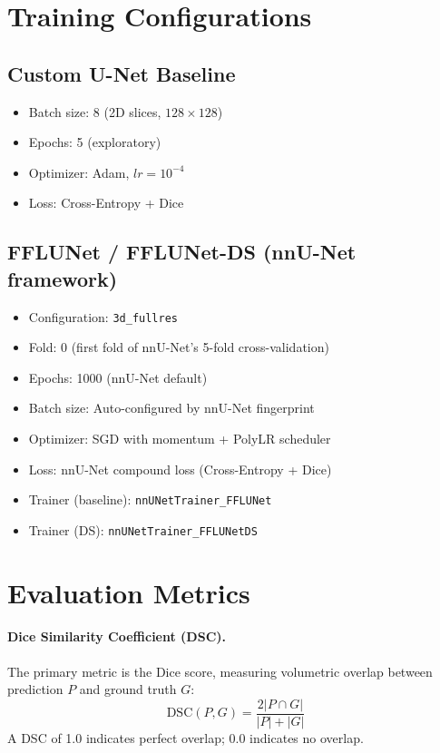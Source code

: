 \documentclass[12pt,a4paper]{report}
\begin{document}
\section{Training Configurations}

\subsection{Custom U-Net Baseline}
\begin{itemize}[leftmargin=*]
    \item Batch size: 8 (2D slices, $128 \times 128$)
    \item Epochs: 5 (exploratory)
    \item Optimizer: Adam, $lr = 10^{-4}$
    \item Loss: Cross-Entropy + Dice
\end{itemize}

\subsection{FFLUNet / FFLUNet-DS (nnU-Net framework)}
\begin{itemize}[leftmargin=*]
    \item Configuration: \texttt{3d\_fullres}
    \item Fold: 0 (first fold of nnU-Net's 5-fold cross-validation)
    \item Epochs: 1000 (nnU-Net default)
    \item Batch size: Auto-configured by nnU-Net fingerprint
    \item Optimizer: SGD with momentum + PolyLR scheduler
    \item Loss: nnU-Net compound loss (Cross-Entropy + Dice)
    \item Trainer (baseline): \texttt{nnUNetTrainer\_FFLUNet}
    \item Trainer (DS): \texttt{nnUNetTrainer\_FFLUNetDS}
\end{itemize}

\section{Evaluation Metrics}

\paragraph{Dice Similarity Coefficient (DSC).}
The primary metric is the Dice score, measuring volumetric overlap between prediction $P$ and ground truth $G$:
\begin{equation}
\text{DSC}(P, G) = \frac{2|P \cap G|}{|P| + |G|}
\end{equation}
A DSC of 1.0 indicates perfect overlap; 0.0 indicates no overlap.
\end{document}
